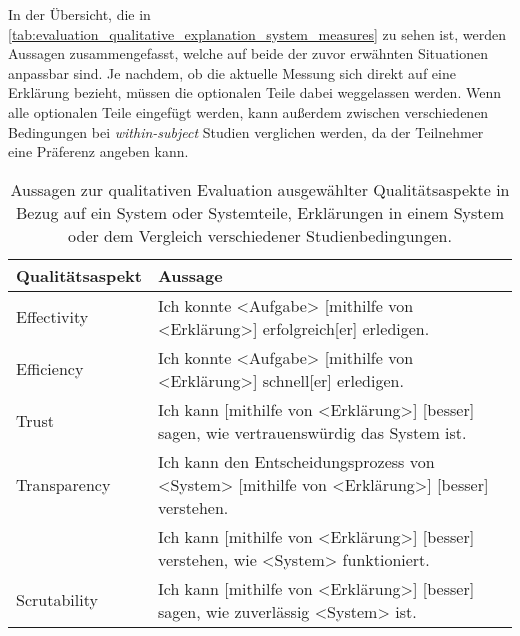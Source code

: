 In der Übersicht, die in \autoref{tab:evaluation_qualitative_explanation_system_measures} zu sehen ist, werden Aussagen zusammengefasst, welche auf beide der zuvor erwähnten Situationen anpassbar sind. Je nachdem, ob die aktuelle Messung sich direkt auf eine Erklärung bezieht, müssen die optionalen Teile dabei weggelassen werden. Wenn alle optionalen Teile eingefügt werden, kann außerdem zwischen verschiedenen Bedingungen bei \textit{within-subject} Studien verglichen werden, da der Teilnehmer eine Präferenz angeben kann.

\begin{table}[htb!]
    \begin{center}
        \begin{tabular}{|p{} p{}|}
            \hline
            \textbf{Qualitätsaspekt} & \textbf{Aussage} \\
            \hline
            \hline
            Effectivity     & Ich konnte <Aufgabe> [mithilfe von <Erklärung>] erfolgreich[er] erledigen.
                                \cite[vgl.][]{balog_measuring_2020, hernandez-bocanegra_effects_2020} \\
            \hline
            Efficiency      & Ich konnte <Aufgabe> [mithilfe von <Erklärung>] schnell[er] erledigen.
                                \cite[vgl.][]{balog_measuring_2020, hernandez-bocanegra_effects_2020} \\
            \hline
            Trust           & Ich kann [mithilfe von <Erklärung>] [besser] sagen, wie vertrauenswürdig das System ist.
                                \cite[vgl.][]{hoffman_metrics_nodate, balog_measuring_2020, weitz_you_2019, hernandez-bocanegra_effects_2020} \\
            \hline
            Transparency    & Ich kann den Entscheidungsprozess von <System> [mithilfe von <Erklärung>] [besser]
                                verstehen.
                                \cite[vgl.][]{wang_is_2018, balog_measuring_2020} \\
                            & Ich kann [mithilfe von <Erklärung>] [besser] verstehen, wie <System> funktioniert.
                                \cite[vgl.][]{riveiro_thats_2021, hoffman_metrics_nodate, hernandez-bocanegra_effects_2020} \\
            \hline
            Scrutability    &  Ich kann [mithilfe von <Erklärung>] [besser] sagen, wie zuverlässig <System> ist.
                                \cite[vgl.][]{hoffman_metrics_nodate, balog_measuring_2020} \\
            \hline
        \end{tabular}
    \end{center}
    \caption{Aussagen zur qualitativen Evaluation ausgewählter Qualitätsaspekte in Bezug auf ein System oder Systemteile, Erklärungen in einem System oder dem Vergleich verschiedener Studienbedingungen.}
    \label{tab:evaluation_qualitative_explanation_system_measures}
\end{table}

